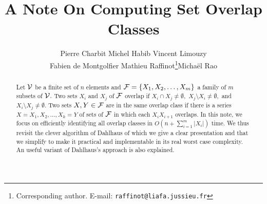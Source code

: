 \documentclass{llncs}
\begin{document}
  
  
  
\setcounter{algo}{0}  
\newenvironment{algo}[1]{\refstepcounter{algo}  
\begin{center}\sl Algorithm \thealgo: #1  
\begin{boxedminipage}{0.95\textwidth}  
}{\end{boxedminipage}\end{center}}

\newcommand{\mC}{\mathcal{C}}  
\newcommand{\mF}{\mathcal{F}}  





\newenvironment{preuve}{\noindent {\it Proof.}}{$\Box$\vskip1ex}  
\newenvironment{preuveA1}{\noindent {\it Proof of conservation of   
Property $A_1$.}}{$\Box$\vskip1ex}  
\newenvironment{preuveA2}{\noindent {\it Proof of conservation of   
Property $A_2$.}}{$\Box$\vskip1ex}  
\newenvironment{preuveB}{\noindent {\it Proof of the invariants.}}  
{$\Box$\vskip1ex}  
\newenvironment{OJO}{\noindent {\bf OJO:}}{$\Box$\vskip1ex}  
  


\title{A Note On Computing Set Overlap Classes}    
  
 

\author{Pierre Charbit\quad
Michel Habib \quad
Vincent Limouzy\\
Fabien de Montgolfier\quad
Mathieu Raffinot\thanks{Corresponding author. E-mail: {\tt raffinot@liafa.jussieu.fr}}\quad Micha\"el Rao}

\maketitle 
  
  
\begin{abstract}
Let ${\cal V}$ be a finite set of $n$ elements and ${\cal F}=\{X_1,X_2,
\ldots , X_m\}$ a family of $m$ subsets of ${\cal V}.$ Two sets
$X_i$ and $X_j$ of ${\cal F}$ overlap if $X_i \cap X_j \neq
\emptyset,$ $X_j \setminus X_i \neq \emptyset,$ and $X_i \setminus X_j
\neq \emptyset.$ Two sets $X,Y\in {\cal F}$ are in the same overlap
class if there is a series $X=X_1,X_2, \ldots, X_k=Y$ of sets of
${\cal F}$ in which each $X_iX_{i+1}$ overlaps. In this note, we focus
on efficiently identifying all overlap classes in $O(n+\sum_{i=1}^m
|X_i|)$ time. We thus revisit the clever algorithm of Dahlhaus
\cite{Dahlhaus00} of which we give a clear presentation and that we
simplify to make it practical and implementable in its real worst case
complexity. An useful variant of Dahlhaus's approach is also explained.  
\end{abstract}  
  
\end{document}

